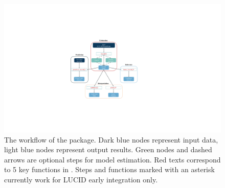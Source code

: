 \begin{figure}[]
    \centering
    \includegraphics[scale = 0.5]{figures/fig2.pdf}
    \caption{The workflow of the  package. Dark blue nodes represent input data, light blue nodes represent output results. Green nodes and dashed arrows are optional steps for model estimation. Red texts correspond to 5 key functions in . Steps and functions marked with an asterisk currently work for LUCID early integration only.}
    \label{fig2}
\end{figure}
